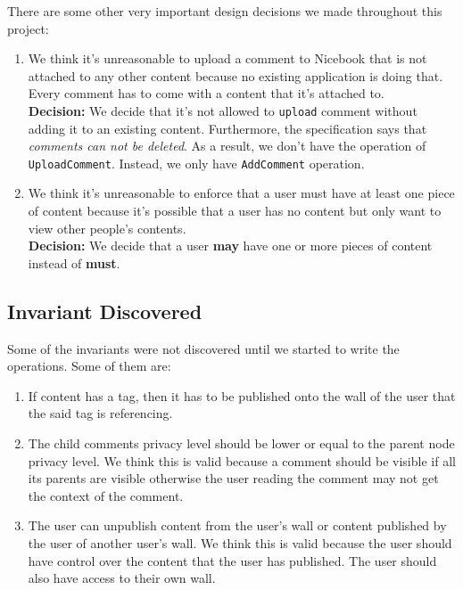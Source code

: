 \documentclass[titlepage]{article}
\begin{document}
There are some other very important design decisions we made throughout this project:

\begin{enumerate}
    \item We think it's unreasonable to upload a comment to Nicebook that is not attached to any other content because no existing application is doing that. Every comment has to come with a content that it's attached to.\\
    \textbf{Decision:} We decide that it's not allowed to \texttt{upload} comment without adding it to an existing content. Furthermore, the specification says that \textit{comments can not be deleted}. As a result, we don't have the operation of \texttt{UploadComment}. Instead, we only have \texttt{AddComment} operation.
    
    \item We think it's unreasonable to enforce that a user must have at least one piece of content because it's possible that a user has no content  but only want to view other people's contents.\\
    \textbf{Decision:} We decide that a user \textbf{may} have one or more pieces of content instead of \textbf{must}.
\end{enumerate}

\subsection{Invariant Discovered}

Some of the invariants were not discovered until we started to write the operations. Some of them are:

\begin{enumerate}
    \item If content has a tag, then it has to be published onto the wall of the user that the said tag is referencing. 
    \item The child comments privacy level should be lower or equal to the parent node privacy level. We think this is valid because a comment should be visible if all its parents are visible otherwise the user reading the comment may not get the context of the comment. 
    \item The user can unpublish content from the user's wall or content published by the user of another user's wall. We think this is valid because the user should have control over the content that the user has published. The user should also have access to their own wall.
\end{enumerate}
\end{document}
